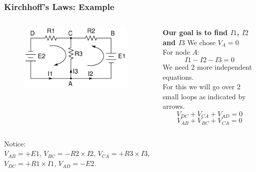 \documentclass[beamer]{standalone}
\begin{document}
\begin{frame}
 \frametitle{Kirchhoff's Laws: Example}
	\begin{columns}[t]
		\begin{column}{.5\textwidth}
			\begin{figure}
				\includegraphics[width=0.95\textwidth]{./circuits/sample_circuit}
			\end{figure}
		\end{column}
		\begin{column}{.5\textwidth}
			{\bf Our goal is to find $I1$, $I2$ and $I3$}
			We chose $V_A=0$ \\
			For node $A$:\\
			\begin{equation}
				I1-I2-I3=0 
			\end{equation}
			We need 2 more \alert{independent} equations. \\
			For this we will go over 2 small loops as indicated by arrows.\\
			\begin{equation}
				V_{DC}+V_{CA}+V_{AD}=0 
			\end{equation}
			\begin{equation}
				V_{AB}+V_{BC}+V_{CA}=0
			\end{equation}
		\end{column}
	\end{columns}
	Notice:\\
				$V_{AB} = + E1$,
				$V_{BC} = - R2 \times I2$,
				$V_{CA} = + R3 \times I3$, \\
				$V_{DC} = + R1 \times I1$,
				$V_{AD} = - E2$.
\end{frame}
\end{document}
